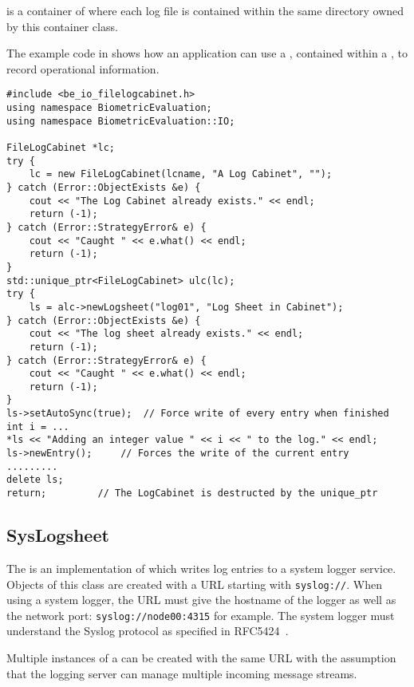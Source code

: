  is a container of  where
each log file is contained within the same directory owned by this container
class.

The example code in  shows how an application can use 
a , contained within a , to record
operational information.

\begin{lstlisting}[caption={Using a \class{FileLogsheet} within a \class{FileLogCabinet}}, label=lst:logcabinetuse]
#include <be_io_filelogcabinet.h>
using namespace BiometricEvaluation;
using namespace BiometricEvaluation::IO;

FileLogCabinet *lc;
try {
    lc = new FileLogCabinet(lcname, "A Log Cabinet", "");
} catch (Error::ObjectExists &e) {
    cout << "The Log Cabinet already exists." << endl;
    return (-1);
} catch (Error::StrategyError& e) {
    cout << "Caught " << e.what() << endl;
    return (-1);
}
std::unique_ptr<FileLogCabinet> ulc(lc);
try {
    ls = alc->newLogsheet("log01", "Log Sheet in Cabinet");
} catch (Error::ObjectExists &e) {
    cout << "The log sheet already exists." << endl;
    return (-1);
} catch (Error::StrategyError& e) {
    cout << "Caught " << e.what() << endl;
    return (-1);
}
ls->setAutoSync(true);	// Force write of every entry when finished
int i = ...
*ls << "Adding an integer value " << i << " to the log." << endl;
ls->newEntry();		// Forces the write of the current entry
.........
delete ls;
return;			// The LogCabinet is destructed by the unique_ptr
\end{lstlisting}

\subsection{SysLogsheet}
\label{sec-syslogsheet}

The  is an implementation of  which writes
log entries to a system logger service. Objects of this class are created
with a URL starting with \verb=syslog://=.
When using a system logger, the URL must give the hostname of the logger as
well as the network port: \verb=syslog://node00:4315= for example. The system
logger must understand the Syslog protocol as specified in
RFC5424~\cite{rfc5425}.

Multiple instances of a  can be created with the same URL
with the assumption that the logging server can manage multiple incoming
message streams.

